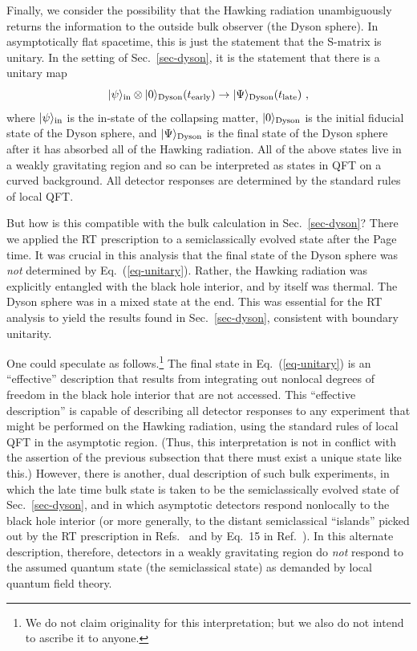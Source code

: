 \documentclass[12pt,letterpaper]{article}
\begin{document}
Finally, we consider the possibility that the Hawking radiation unambiguously returns the information to the outside bulk observer (the Dyson sphere). In asymptotically flat spacetime, this is just the statement that the S-matrix is unitary. In the setting of Sec.~\ref{sec-dyson}, it is the statement that there is a unitary map
\begin{equation}
  |\psi\rangle_{\rm in} \otimes |0\rangle_{\rm Dyson}(t_{\rm early}) \to |\Psi\rangle_{\rm Dyson} (t_{\rm late})~,
  \label{eq-unitary}
\end{equation}
where $|\psi\rangle_{\rm in}$ is the in-state of the collapsing matter, $|0\rangle_{\rm Dyson}$ is the initial fiducial state of the Dyson sphere, and $|\Psi\rangle_{\rm Dyson}$ is the final state of the Dyson sphere after it has absorbed all of the Hawking radiation. All of the above states live in a weakly gravitating region and so can be interpreted as states in QFT on a curved background. All detector responses are determined by the standard rules of local QFT.

But how is this compatible with the bulk calculation in Sec.~\ref{sec-dyson}? There we applied the RT prescription to a semiclassically evolved state after the Page time. It was crucial in this analysis that the final state of the Dyson sphere was {\em not\/} determined by Eq.~(\ref{eq-unitary}). Rather, the Hawking radiation was explicitly entangled with the black hole interior, and by itself was thermal. The Dyson sphere was in a mixed state at the end. This was essential for the RT analysis to yield the results found in Sec.~\ref{sec-dyson}, consistent with boundary unitarity.

One could speculate as follows.\footnote{We do not claim originality for this interpretation; but we also do not intend to ascribe it to anyone.} The final state in Eq.~(\ref{eq-unitary}) is an ``effective'' description that results from integrating out nonlocal degrees of freedom in the black hole interior that are not accessed. This ``effective description'' is capable of describing all detector responses to any experiment that might be performed on the Hawking radiation, using the standard rules of local QFT in the asymptotic region. (Thus, this interpretation is not in conflict with the assertion of the previous subsection that there must exist a unique state like this.) However, there is another, dual description of such bulk experiments, in which the late time bulk state is taken to be the semiclassically evolved state of Sec.~\ref{sec-dyson}, and in which asymptotic detectors respond nonlocally to the black hole interior (or more generally, to the distant semiclassical ``islands'' picked out by the RT prescription in Refs.~\cite{Pen19,AEMM} and by Eq.~15 in Ref.~\cite{AMMZ}). In this alternate description, therefore, detectors in a weakly gravitating region do {\em not} respond to the assumed quantum state (the semiclassical state) as demanded by local quantum field theory.
\end{document}
